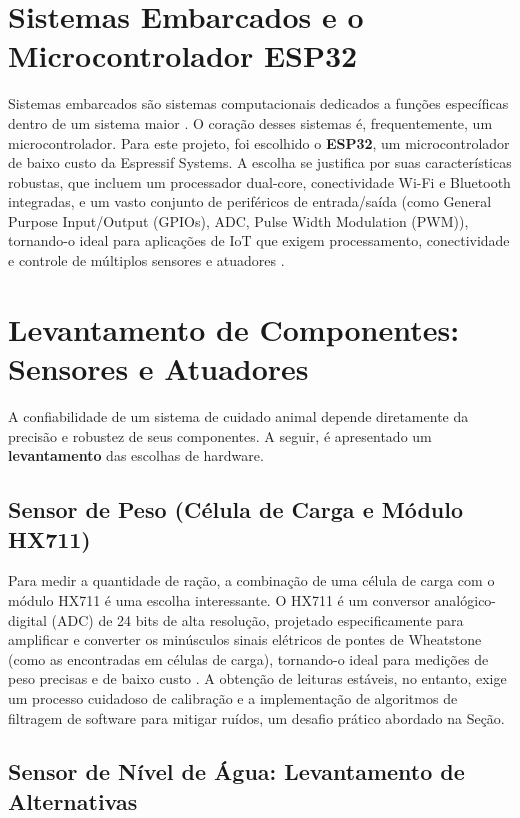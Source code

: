 \section{Sistemas Embarcados e o Microcontrolador ESP32}
Sistemas embarcados são sistemas computacionais dedicados a funções específicas dentro de um sistema maior \cite{jacomini2024}.
O coração desses sistemas é, frequentemente, um microcontrolador. Para este projeto, foi escolhido o \textbf{ESP32}, um microcontrolador de baixo custo da Espressif Systems.
A escolha se justifica por suas características robustas, que incluem um processador dual-core, conectividade Wi-Fi e Bluetooth integradas, e um vasto conjunto de periféricos de entrada/saída (como General Purpose Input/Output (GPIOs), ADC, Pulse Width Modulation (PWM)), tornando-o ideal para aplicações de IoT que exigem processamento, conectividade e controle de múltiplos sensores e atuadores \cite{jacomini2024}.
\section{Levantamento de Componentes: Sensores e Atuadores}
A confiabilidade de um sistema de cuidado animal depende diretamente da precisão e robustez de seus componentes.
A seguir, é apresentado um \textbf{levantamento} das escolhas de hardware.

\subsection{Sensor de Peso (Célula de Carga e Módulo HX711)}
Para medir a quantidade de ração, a combinação de uma célula de carga com o módulo HX711 é uma escolha interessante.
O HX711 é um conversor analógico-digital (ADC) de 24 bits de alta resolução, projetado especificamente para amplificar e converter os minúsculos sinais elétricos de pontes de Wheatstone (como as encontradas em células de carga), tornando-o ideal para medições de peso precisas e de baixo custo \cite{hx711_guide, hx711_tech}.
A obtenção de leituras estáveis, no entanto, exige um processo cuidadoso de calibração e a implementação de algoritmos de filtragem de software para mitigar ruídos, um desafio prático abordado na Seção.
\subsection{Sensor de Nível de Água: Levantamento de Alternativas}
\label{sec:sensor_agua}

